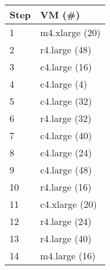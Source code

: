 {\scriptsize
\begin{tabular}{@{}p{0.2cm}l@{}}
\toprule
\textbf{Step} & \textbf{VM (\#)} \\ \hline
1 & m4.xlarge (20) \\
2 & r4.large (48) \\
3 & c4.large (16) \\
4 & c4.large (4) \\
5 & c4.large (32) \\
6 & r4.large (32) \\
7 & c4.large (40) \\
8 & c4.large (24) \\
9 & c4.large (48) \\
10 & r4.large (16) \\
11 & c4.xlarge (20) \\
12 & r4.large (24) \\
13 & r4.large (40) \\
14 & m4.large (16) \\ \hline
\end{tabular}
}
